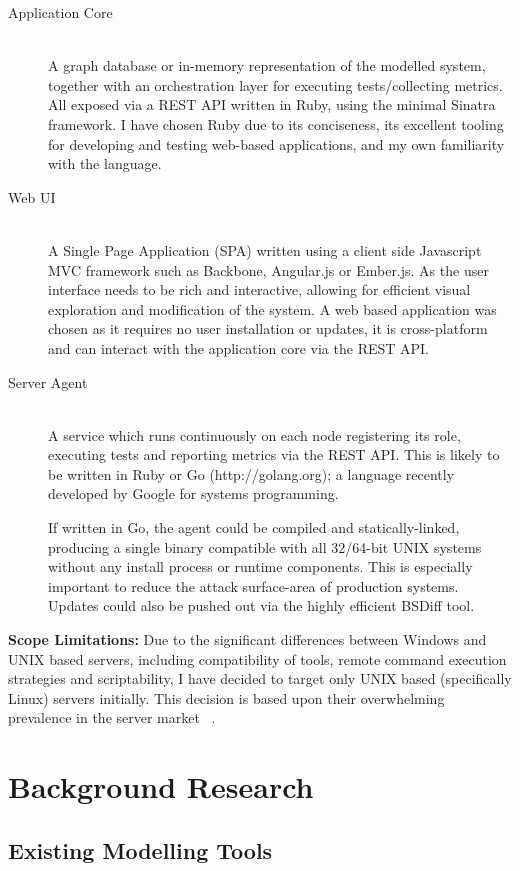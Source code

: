 \documentclass{cshonours}
\begin{document}
\begin{description}
  \item [Application Core]\hfill \\
    A graph database or in-memory representation of the modelled system, together with an orchestration layer for executing tests/collecting metrics. All exposed via a REST API written in Ruby, using the minimal Sinatra framework. I have chosen Ruby due to its conciseness, its excellent tooling for developing and testing web-based applications, and my own familiarity with the language.
  \item [Web UI]\hfill \\
    A Single Page Application (SPA) written using a client side Javascript MVC framework such as Backbone, Angular.js or Ember.js. As the user interface needs to be rich and interactive, allowing for efficient visual exploration and modification of the system. A web based application was chosen as it requires no user installation or updates, it is cross-platform and can interact with the application core via the REST API.
  \item [Server Agent]\hfill \\
    A service which runs continuously on each node registering its role, executing tests and reporting metrics via the REST API. This is likely to be written in Ruby or Go (http://golang.org); a language recently developed by Google for systems programming.

    If written in Go, the agent could be compiled and statically-linked, producing a single binary compatible with all 32/64-bit UNIX systems without any install process or runtime components. This is especially important to reduce the attack surface-area of production systems. Updates could also be pushed out via the highly efficient BSDiff tool.
\end{description}

\textbf{Scope Limitations:} Due to the significant differences between Windows and UNIX based servers, including compatibility of tools, remote command execution strategies and scriptability, I have decided to target only UNIX based (specifically Linux) servers initially. This decision is based upon their overwhelming prevalence in the server market ~\cite{LinuxMarketShare}.

\section{Background Research}
\subsection{Existing Modelling Tools}
\end{document}
